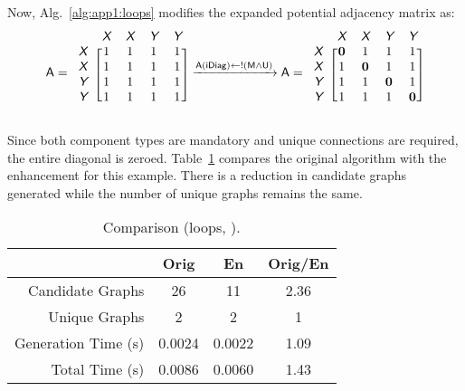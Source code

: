 \noindent Now, Alg.~\ref{alg:app1:loops} modifies the expanded potential adjacency matrix as:
\begin{align}
\begin{aligned}
\xvar{A} = \begin{blockarray}{ccccc}
& \xcolor{X} & \xcolor{X} & \xcolor{Y} & \xcolor{Y} \\
\begin{block}{c[cccc]}
\xcolor{X} & 1 & 1 & 1 & 1 \\
\xcolor{X} & 1 & 1 & 1 & 1 \\
\xcolor{Y} & 1 & 1 & 1 & 1 \\
\xcolor{Y} & 1 & 1 & 1 & 1 \\
\end{block}
\end{blockarray}
\xrightarrow{\xvar{A}(\xvar{iDiag}) \leftarrow !\left(\xvar{M} \land \xvar{U}\right)}
\xvar{A} = \begin{blockarray}{ccccc}
& \xcolor{X} & \xcolor{X} & \xcolor{Y} & \xcolor{Y} \\
\begin{block}{c[cccc]}
\xcolor{X} & \bm{0} & 1 & 1 & 1 \\
\xcolor{X} & 1 & \bm{0} & 1 & 1 \\
\xcolor{Y} & 1 & 1 & \bm{0} & 1 \\
\xcolor{Y} & 1 & 1 & 1 & \bm{0} \\
\end{block}
\end{blockarray}
\end{aligned}
\end{align}
\vspace{-2em}

\noindent Since both component types are mandatory and unique connections are required, the entire diagonal is zeroed.
Table~\ref{tb:app1:loops-ex2} compares the original algorithm with the enhancement for this example. There is a reduction in candidate graphs generated while the number of unique graphs remains the same.

\begin{table}[!ht]
\centering
\caption{Comparison (loops, ).\label{tb:app1:loops-ex2}}
\begin{tabular}{r | c | c | c}
\hline \hline
& Orig & En & Orig/En \\
\hline
Candidate Graphs & 26 & 11 & 2.36 \\ 
Unique Graphs & 2 & 2 & 1 \\
Generation Time (s) & 0.0024 & 0.0022 & 1.09 \\
Total Time (s) & 0.0086 & 0.0060 & 1.43 \\
\hline \hline
\end{tabular}
\end{table}